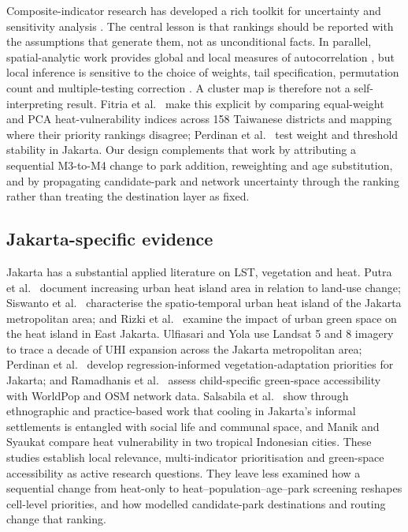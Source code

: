 \documentclass[times,twoside]{_Templates/MultiTargetManuscript}
\begin{document}
Composite-indicator research has developed a rich toolkit for uncertainty and
sensitivity analysis \citep{saisana2005,paruolo2013,greco2019}. The central
lesson is that rankings should be reported with the assumptions that generate
them, not as unconditional facts. In parallel, spatial-analytic work provides
global and local measures of autocorrelation \citep{anselin1995,getis1992}, but
local inference is sensitive to the choice of weights, tail specification,
permutation count and multiple-testing correction
\citep{benjamini1995,benjamini2001}. A cluster map is therefore not a
self-interpreting result. Fitria et al.\ \citep{fitria2026} make this explicit
by comparing equal-weight and PCA heat-vulnerability indices across 158
Taiwanese districts and mapping where their priority rankings disagree; Perdinan
et al.\ \citep{perdinan2026} test weight and threshold stability in Jakarta.
Our design complements that work by attributing a sequential M3-to-M4 change to
park addition, reweighting and age substitution, and by propagating
candidate-park and network uncertainty through the ranking rather than treating
the destination layer as fixed.

\subsection{Jakarta-specific evidence}

Jakarta has a substantial applied literature on LST, vegetation and heat. Putra
et al.\ \citep{putra2021} document increasing urban heat island area in relation
to land-use change; Siswanto et al.\ \citep{siswanto2023} characterise the
spatio-temporal urban heat island of the Jakarta metropolitan area; and Rizki et
al.\ \citep{rizki2024} examine the impact of urban green space on the heat island
in East Jakarta. Ulfiasari and Yola \citep{ulfiasari2022} use Landsat 5 and 8
imagery to trace a decade of UHI expansion across the Jakarta metropolitan area;
Perdinan et al.\ \citep{perdinan2026} develop regression-informed
vegetation-adaptation priorities for Jakarta; and Ramadhanis et al.\
\citep{ramadhanis2026} assess child-specific green-space accessibility with
WorldPop and OSM network data. Salsabila et al.\ \citep{salsabila2023} show
through ethnographic and practice-based work that cooling in Jakarta's informal
settlements is entangled with social life and communal space, and Manik and
Syaukat \citep{manik2017} compare heat vulnerability in two tropical Indonesian
cities. These studies establish local relevance, multi-indicator prioritisation
and green-space accessibility as active research questions. They leave less
examined how a sequential change from heat-only to heat--population--age--park
screening reshapes cell-level priorities, and how modelled candidate-park
destinations and routing change that ranking.
\end{document}
